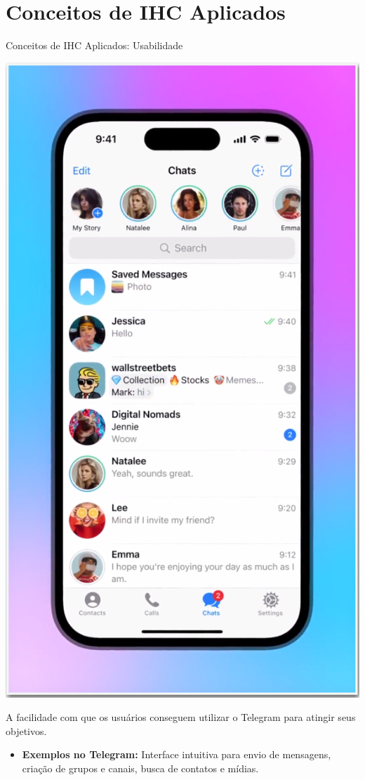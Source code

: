 \documentclass[aspectratio=169,xcolor=table]{beamer}
\begin{document}
\section{Conceitos de IHC Aplicados}
\begin{frame}{Conceitos de IHC Aplicados: Usabilidade}
    \begin{center}
        \includegraphics[height=0.4\textheight]{telegram-interface.jpg}
    \end{center}
    
    A facilidade com que os usuários conseguem utilizar o Telegram para atingir seus objetivos.
    
    \begin{itemize}
        \item \textbf{Exemplos no Telegram:} Interface intuitiva para envio de mensagens, criação de grupos e canais, busca de contatos e mídias.
    \end{itemize}
\end{frame}
\end{document}
